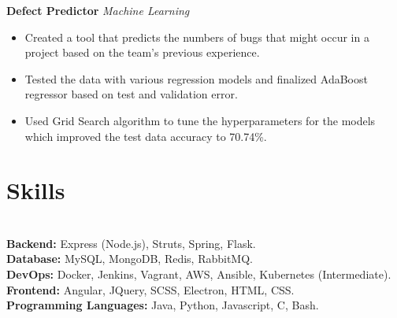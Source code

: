 \documentclass{resume}
\begin{document}
\textbf{Defect Predictor} \hfill \textit{Machine Learning}
\begin{itemize}
  \item Created a tool that predicts the numbers of bugs that might occur in a project based on the team's previous experience.
  \item Tested the data with various regression models and finalized AdaBoost regressor based on test and validation error.
  \item Used Grid Search algorithm to tune the hyperparameters for the models which improved the test data accuracy to 70.74\%.
\end{itemize}
\section*{Skills}
\titlerule
\noindent
\\
\textbf{Backend:} Express (Node.js), Struts, Spring, Flask. \\
\textbf{Database:} MySQL, MongoDB, Redis, RabbitMQ. \\
\textbf{DevOps:} Docker, Jenkins, Vagrant, AWS, Ansible, Kubernetes (Intermediate). \\
\textbf{Frontend:} Angular, JQuery, SCSS, Electron, HTML, CSS. \\
\textbf{Programming Languages:} Java, Python, Javascript, C, Bash.\\
\end{document}
